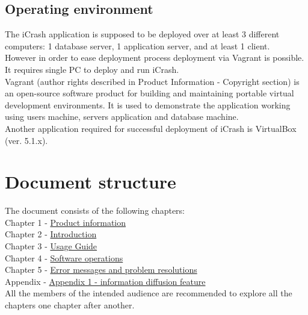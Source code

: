 \subsection{Operating environment}
The iCrash application is supposed to be deployed over at least 3 different
computers: 1 database server, 1 application server, and at least 1 client.\\

However in order to ease deployment process deployment via Vagrant is possible.
It requires single PC to deploy and run iCrash.\\

Vagrant (author rights described in Product Information - Copyright section) is
an open-source software product for building and maintaining portable virtual
development environments. It is used to demonstrate the application working using users machine, servers application and database machine.\\

Another application required for successful deployment of iCrash is VirtualBox
(ver. 5.1.x). \\

\section{Document structure}  

The document consists of the following chapters:\\
Chapter 1 -  \hyperref[chap:information]{Product information}\\
Chapter 2 -  \hyperref[chap:introduction]{Introduction}\\
Chapter 3 -  \hyperref[chap:usage_guide]{Usage Guide}\\
Chapter 4 -  \hyperref[chap:software_operations]{Software operations}\\
Chapter 5 -  \hyperref[chap:error_messages]{Error messages and problem resolutions}\\
Appendix -  \hyperref[chap:appendix1]{Appendix 1 - information diffusion feature}\\

All the members of the intended audience are recommended to explore all the
chapters one chapter after another.







